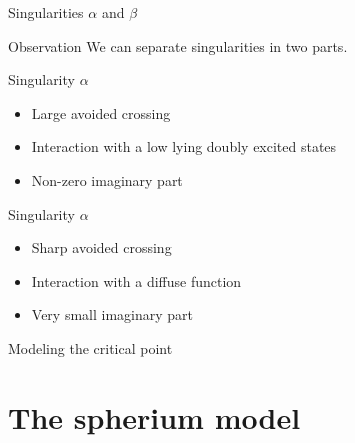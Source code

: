 \documentclass[xcolor=x11names,compress]{beamer}
\renewcommand{\(}{\begin{columns}}
\renewcommand{\)}{\end{columns}}
\newcommand{\<}[1]{\begin{column}{#1}}
\renewcommand{\>}{\end{column}}
\begin{document}
\begin{frame}{Singularities $\alpha$ and $\beta$}

\begin{beamerboxesrounded}[scheme=foncé]{\centering Observation}
We can separate singularities in two parts. 
\end{beamerboxesrounded}    

\begin{beamerboxesrounded}[scheme=foncé]{\centering Singularity $\alpha$}
\begin{itemize}
    \item Large avoided crossing
    \item Interaction with a low lying doubly excited states
    \item Non-zero imaginary part
\end{itemize} 
\end{beamerboxesrounded}  

\begin{beamerboxesrounded}[scheme=foncé]{\centering Singularity $\alpha$}
\begin{itemize}
    \item Sharp avoided crossing
    \item Interaction with a diffuse function 
    \item Very small imaginary part
\end{itemize} 
\end{beamerboxesrounded} 

\end{frame}

\begin{frame}{Modeling the critical point}
    
\end{frame}

\section{The spherium model}
\end{document}
